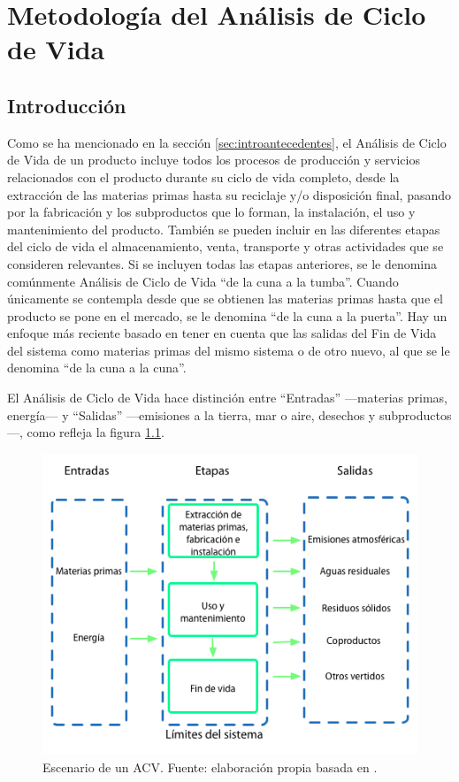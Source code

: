 \chapter{Metodología del Análisis de Ciclo de Vida}\label{cap:metodologia_acv}
\section{Introducción}

Como se ha mencionado en la sección \ref{sec:introantecedentes}, el Análisis de Ciclo de Vida de un producto incluye todos los procesos de producción y servicios relacionados con el producto durante su ciclo de vida completo, desde la extracción de las materias primas hasta su reciclaje y/o disposición final, pasando por la fabricación y los subproductos que lo forman, la instalación, el uso y mantenimiento del producto. También se pueden incluir en las diferentes etapas del ciclo de vida el almacenamiento, venta, transporte y otras actividades que se consideren relevantes. Si se incluyen todas las etapas anteriores, se le denomina comúnmente Análisis de Ciclo de Vida ``de la cuna a la tumba''. Cuando únicamente se contempla desde que se obtienen las materias primas hasta que el producto se pone en el mercado, se le denomina ``de la cuna a la puerta''. Hay un enfoque más reciente basado en tener en cuenta que las salidas del Fin de Vida del sistema como materias primas del mismo sistema o de otro nuevo, al que se le denomina ``de la cuna a la cuna''.


El Análisis de Ciclo de Vida hace distinción entre ``Entradas'' —materias primas, energía— y ``Salidas'' —emisiones a la tierra, mar o aire, desechos y subproductos—, como refleja la figura \ref{fig:escenariolca}.

\begin{figure}[!htb]
\centering
\includegraphics[width=12cm]{img/escenariolca.png}
\caption[Escenario de un ACV.]{Escenario de un ACV. Fuente: elaboración propia basada en \protect\cite{epa}.}
\label{fig:escenariolca}
\end{figure}

